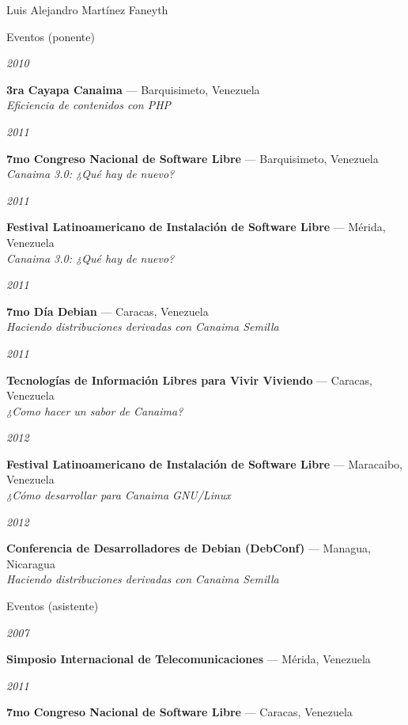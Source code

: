 \documentclass[letterpaper]{scrartcl}
\begin{document}
\begin{cv}{Luis Alejandro Mart\'inez Faneyth}
\begin{cvlist}{Eventos (ponente)}
\item[{\parbox[t]{6em}{\textit{\large{2010}}}}]{
	\parbox[t]{\linewidth}{
		\textbf{3ra Cayapa Canaima} --- Barquisimeto, Venezuela\\
		\textit{Eficiencia de contenidos con PHP}
	}
}
\item[{\parbox[t]{6em}{\textit{\large{2011}}}}]{
	\parbox[t]{\linewidth}{
		\textbf{7mo Congreso Nacional de Software Libre} --- Barquisimeto, Venezuela\\
		\textit{Canaima 3.0: ¿Qu\'e hay de nuevo?}
	}
}
\item[{\parbox[t]{6em}{\textit{\large{2011}}}}]{
	\parbox[t]{\linewidth}{
		\textbf{Festival Latinoamericano de Instalaci\'on de Software Libre} --- M\'erida, Venezuela\\
		\textit{Canaima 3.0: ¿Qu\'e hay de nuevo?}
	}
}
\item[{\parbox[t]{6em}{\textit{\large{2011}}}}]{
	\parbox[t]{\linewidth}{
		\textbf{7mo Día Debian} --- Caracas, Venezuela\\
		\textit{Haciendo distribuciones derivadas con Canaima Semilla}
	}
}
\item[{\parbox[t]{6em}{\textit{\large{2011}}}}]{
	\parbox[t]{\linewidth}{
		\textbf{Tecnolog\'ias de Informaci\'on Libres para Vivir Viviendo} --- Caracas, Venezuela\\
		\textit{¿Como hacer un sabor de Canaima?}
	}
}
\item[{\parbox[t]{6em}{\textit{\large{2012}}}}]{
	\parbox[t]{\linewidth}{
		\textbf{Festival Latinoamericano de Instalaci\'on de Software Libre} --- Maracaibo, Venezuela\\
		\textit{¿Cómo desarrollar para Canaima GNU/Linux}
	}
}
\item[{\parbox[t]{6em}{\textit{\large{2012}}}}]{
	\parbox[t]{\linewidth}{
		\textbf{Conferencia de Desarrolladores de Debian (DebConf)} --- Managua, Nicaragua\\
		\textit{Haciendo distribuciones derivadas con Canaima Semilla}
	}
}
\end{cvlist}

\begin{cvlist}{Eventos (asistente)}
\item[{\parbox[t]{6em}{\textit{\large{2007}}}}]{
	\parbox[t]{\linewidth}{
		\textbf{Simposio Internacional de Telecomunicaciones} --- Mérida, Venezuela\\
	}
}
\item[{\parbox[t]{6em}{\textit{\large{2011}}}}]{
	\parbox[t]{\linewidth}{
		\textbf{7mo Congreso Nacional de Software Libre} --- Caracas, Venezuela\\
	}
}
\end{cvlist}


\end{cv}
\end{document}
